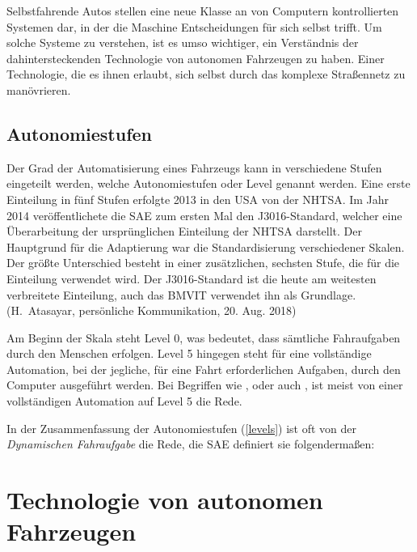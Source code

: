 Selbstfahrende Autos stellen eine neue Klasse an von Computern kontrollierten Systemen dar, in der die Maschine Entscheidungen für sich selbst trifft. Um solche Systeme zu verstehen, ist es umso wichtiger, ein Verständnis der dahintersteckenden Technologie von autonomen Fahrzeugen zu haben. Einer Technologie, die es ihnen erlaubt, sich selbst durch das komplexe Straßennetz zu manövrieren.

\subsection{Autonomiestufen}
Der Grad der Automatisierung eines Fahrzeugs kann in verschiedene Stufen eingeteilt werden, welche Autonomiestufen oder Level genannt werden. Eine erste Einteilung in fünf Stufen erfolgte 2013 in den USA von der \ac{NHTSA}. Im Jahr 2014 veröffentlichete die \ac{SAE} zum ersten Mal den J3016-Standard, welcher eine Überarbeitung der ursprünglichen Einteilung der \ac{NHTSA} darstellt. Der Hauptgrund für die Adaptierung war die Standardisierung verschiedener Skalen. Der größte Unterschied besteht in einer zusätzlichen, sechsten Stufe, die für die Einteilung verwendet wird.  Der J3016-Standard ist die heute am weitesten verbreitete Einteilung, auch das \ac{BMVIT} verwendet ihn als Grundlage. (H.~Atasayar, persönliche Kommunikation, 20. Aug. 2018)

Am Beginn der Skala steht Level 0, was bedeutet, dass sämtliche Fahraufgaben durch den Menschen erfolgen. Level 5 hingegen steht für eine vollständige Automation, bei der jegliche, für eine Fahrt erforderlichen Aufgaben, durch den Computer ausgeführt werden. Bei Begriffen wie ,  oder auch , ist meist von einer vollständigen Automation auf Level 5 die Rede.

In der Zusammenfassung der Autonomiestufen (\ref{levels}) ist oft von der \textit{Dynamischen Fahraufgabe} die Rede, die \ac{SAE} definiert sie folgendermaßen: 

\nocite{wiki-levels}



\section{Technologie von autonomen Fahrzeugen}

